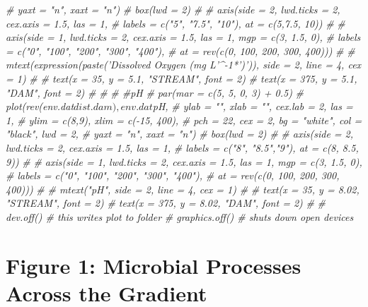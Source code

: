 \documentclass[]{article}
\newenvironment{Shaded}{\begin{snugshade}}{\end{snugshade}}
\newcommand{\CommentTok}[1]{\textcolor[rgb]{0.56,0.35,0.01}{\textit{#1}}}
\begin{document}
\begin{Shaded}
\begin{Highlighting}[]
\CommentTok{#      yaxt = "n", xaxt = "n")}
\CommentTok{# box(lwd = 2)}
\CommentTok{# }
\CommentTok{# axis(side = 2, lwd.ticks = 2, cex.axis = 1.5, las = 1,}
\CommentTok{#     labels = c("5", "7.5", "10"), at = c(5,7.5, 10))}
\CommentTok{# }
\CommentTok{# axis(side = 1, lwd.ticks = 2, cex.axis = 1.5, las = 1, mgp = c(3, 1.5, 0),}
\CommentTok{#    labels = c("0", "100", "200", "300", "400"), }
\CommentTok{#    at = rev(c(0, 100, 200, 300, 400)))}
\CommentTok{# }
\CommentTok{# mtext(expression(paste('Dissolved Oxygen (mg L'^-1*')')), side = 2, line = 4, cex = 1)}
\CommentTok{# }
\CommentTok{# text(x = 35, y = 5.1, "STREAM", font = 2)}
\CommentTok{# text(x = 375, y = 5.1, "DAM", font = 2)}
\CommentTok{# }
\CommentTok{# }
\CommentTok{# #pH}
\CommentTok{# par(mar = c(5, 5, 0, 3) + 0.5)}
\CommentTok{# plot(rev(env.dat$dist.dam), env.dat$pH, }
\CommentTok{#      ylab = "", xlab = "", cex.lab = 2, las = 1,}
\CommentTok{#      ylim = c(8,9), xlim = c(-15, 400),}
\CommentTok{#      pch = 22, cex = 2, bg = "white", col = "black", lwd = 2,}
\CommentTok{#      yaxt = "n", xaxt = "n")}
\CommentTok{# box(lwd = 2)}
\CommentTok{# }
\CommentTok{# axis(side = 2, lwd.ticks = 2, cex.axis = 1.5, las = 1,}
\CommentTok{#     labels = c("8", "8.5","9"), at = c(8, 8.5, 9))}
\CommentTok{# }
\CommentTok{# axis(side = 1, lwd.ticks = 2, cex.axis = 1.5, las = 1, mgp = c(3, 1.5, 0),}
\CommentTok{#    labels = c("0", "100", "200", "300", "400"), }
\CommentTok{#    at = rev(c(0, 100, 200, 300, 400)))}
\CommentTok{# }
\CommentTok{# mtext("pH", side = 2, line = 4, cex = 1)}
\CommentTok{# }
\CommentTok{# text(x = 35, y = 8.02, "STREAM", font = 2)}
\CommentTok{# text(x = 375, y = 8.02, "DAM", font = 2)}
\CommentTok{# }
\CommentTok{# dev.off() # this writes plot to folder}
\CommentTok{# graphics.off() # shuts down open devices}
\end{Highlighting}
\end{Shaded}

\section{Figure 1: Microbial Processes Across the
Gradient}\label{figure-1-microbial-processes-across-the-gradient}
\end{document}
